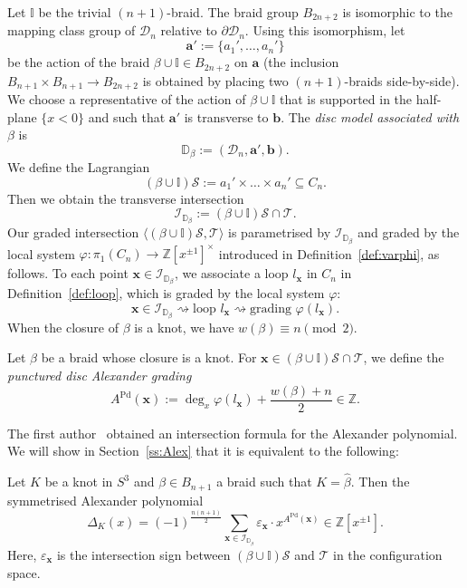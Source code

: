 \documentclass[11pt]{amsart}
\numberwithin{equation}{section}
\numberwithin{figure}{section}
\theoremstyle{definition}
\newcommand{\cD}{\mathcal{D}}
\newcommand{\cI}{\mathcal{I}}
\newcommand{\cs}{\mathscr{S}}
\newcommand{\ct}{\mathscr{T}}
\newcommand{\bD}{\mathbb{D}}
\newcommand{\bI}{\mathbb{I}}
\newcommand{\bZ}{\mathbb{Z}}
\DeclareMathOperator{\Pd}{Pd}
\newcommand{\ba}{\boldsymbol{a}}
\newcommand{\bb}{\boldsymbol{b}}
\newcommand{\xs}{\boldsymbol{x}}
\begin{document}
Let $\bI$ be the trivial $(n+1)$-braid. The braid group $B_{2n+2}$ is isomorphic to the mapping class group of $\cD_n$ relative to $\partial \cD_n$. Using this isomorphism, let
\[
\ba' := \{a_1',\dots,a_n'\}
\]
be the action of the braid $\beta \cup \mathbb I \in B_{2n+2}$ on $\ba$ (the inclusion $B_{n+1} \times B_{n+1} \to B_{2n+2}$ is obtained by placing two $(n+1)$-braids side-by-side). We choose a representative of the action of $\beta \cup \bI$ that is supported in the half-plane $\{x<0\}$ and such that $\ba'$ is transverse to $\bb$. The \emph{disc model associated with $\beta$} is
\[
\bD_\beta := (\cD_n, \ba', \bb).
\]
We define the Lagrangian 
\[
(\beta \cup \mathbb I)\cs := a_1' \times \dots \times a_n' \subseteq C_n.
\]
Then we obtain the transverse intersection
\begin{equation}
\cI_{\bD_\beta} := (\beta \cup \mathbb I) \cs \cap \ct.
\end{equation}
Our graded intersection $\langle  (\beta \cup \mathbb I) \cs, \ct \rangle$ is parametrised by $\cI_{\bD_\beta}$ and graded by the local system $\varphi \colon \pi_1(C_n) \to \bZ[x^{\pm 1}]^\times$ introduced in Definition~\ref{def:varphi}, as follows. To each point $\xs \in \cI_{\bD_\beta}$, we associate a loop $l_{\xs}$ in $C_n$ in Definition~\ref{def:loop}, which is graded by the local system $\varphi$:
\[
\xs \in \cI_{\bD_\beta} \rightsquigarrow \text{loop } l_{\xs} \rightsquigarrow \text{grading }  \varphi(l_{\xs}).
\]
When the closure of $\beta$ is a knot, we have $w(\beta) \equiv n \pmod 2$.

\begin{defn}\label{def:grdisc} 
Let $\beta$ be a braid whose closure is a knot. For $\xs \in (\beta \cup \mathbb I) \cs \cap \ct$, we define the \emph{punctured disc Alexander grading}
\begin{equation}\label{ALphi}
A^{\Pd}(\xs):=\deg_x \varphi(l_{\xs}) + \frac{w(\beta)+n}{2} \in \bZ.
\end{equation}
\end{defn}

The first author~\cite{Anghel2024AIF} obtained an intersection formula for the Alexander polynomial. We will show in Section~\ref{ss:Alex} that it is equivalent to the following:

\begin{thm}\label{thm:Alexander-disc}
Let $K$ be a knot in $S^3$ and $\beta \in B_{n+1}$ a braid such that $K = \hat{\beta}$.
Then the symmetrised Alexander polynomial
\begin{equation}\label{eqn:Alexander}
\Delta_K(x)= (-1)^{\frac{n(n+1)}{2}} \sum_{\xs\in \cI_{\bD_\beta}} \varepsilon_{\xs}\cdot x^{A^{\Pd}(\xs)} \in \bZ[x^{\pm 1}].
\end{equation}
Here, $\varepsilon_{\xs}$ is the intersection sign between $(\beta\cup \mathbb I)\cs$ and $\ct$ in the configuration space.
\end{thm}
\end{document}
